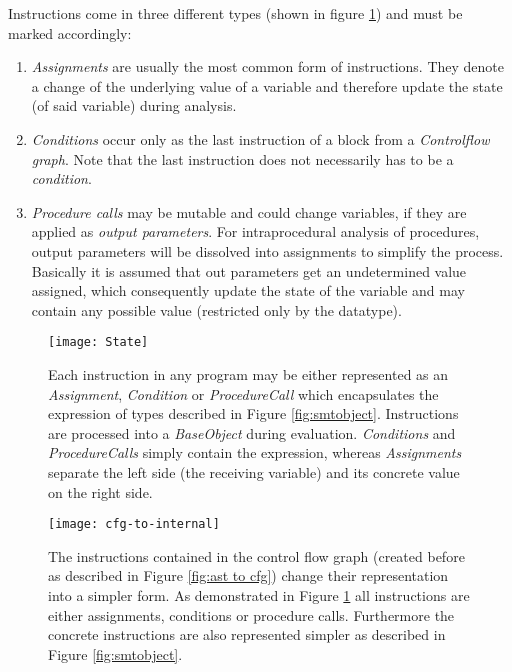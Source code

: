 Instructions come in three different types (shown in figure \ref{fig:state}) and must be marked accordingly:
\begin{enumerate}
	\item \emph{Assignments} are usually the most common form of instructions. They denote a change of the underlying value of a variable and therefore update the state (of said variable) during analysis. 
	\item \emph{Conditions} occur only as the last instruction of a block from a \emph{Controlflow graph}. Note that the last instruction does not necessarily has to be a \emph{condition}.
	\item \emph{Procedure calls} may be mutable and could change variables, if they are applied as \emph{output parameters}. %
	For intraprocedural analysis of procedures, output parameters will be dissolved into assignments to simplify the process. Basically it is assumed that out parameters get an undetermined value assigned, which consequently update the state of the variable and may contain any possible value (restricted only by the datatype).
\end{enumerate}
\begin{figure}
	\centering
	\texttt{[image: State]}
	\caption{Each instruction in any program may be either represented as an \emph{Assignment}, \emph{Condition} or \emph{ProcedureCall} which encapsulates the expression of types described in Figure \ref{fig:smtobject}. Instructions are processed into a \emph{BaseObject} during evaluation. \emph{Conditions} and \emph{ProcedureCalls} simply contain the expression, whereas \emph{Assignments} separate the left side (the receiving variable) and its concrete value on the right side.}
	\label{fig:state}
\end{figure}
\begin{figure}
	\centering
	\texttt{[image: cfg-to-internal]}
	\caption{The instructions contained in the control flow graph (created before as described in Figure \ref{fig:ast to cfg}) change their representation into a simpler form. As demonstrated in Figure \ref{fig:state} all instructions are either assignments, conditions or procedure calls. Furthermore the concrete instructions are also represented simpler as described in Figure \ref{fig:smtobject}. }
	\label{fig:cfg to internal}
\end{figure}


